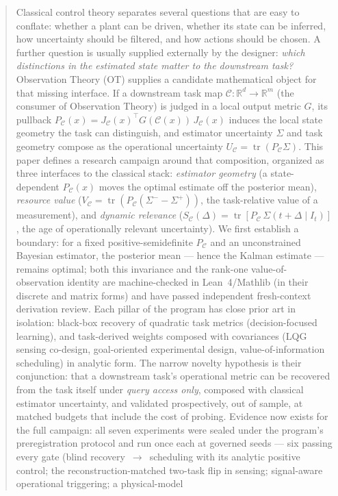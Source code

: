 \documentclass[letterpaper,onecolumn]{IEEEtran}
\theoremstyle{definition}
\theoremstyle{remark}
\newcommand{\R}{\mathbb{R}}
\newcommand{\PC}{P_{\mathcal{C}}}
\newcommand{\tr}{\operatorname{tr}}
\newcommand{\C}{\mathcal{C}}
\newcommand{\Sig}{\Sigma}
\newcommand{\Sm}{\Sigma^{-}}
\newcommand{\Sp}{\Sigma^{+}}
\newcommand{\VC}{V_{\mathcal{C}}}
\newcommand{\UC}{U_{\mathcal{C}}}
\newcommand{\SC}{S_{\mathcal{C}}}
\begin{document}
\begin{abstract}
Classical control theory separates several questions that are easy to
conflate: whether a plant can be driven, whether its state can be inferred,
how uncertainty should be filtered, and how actions should be chosen. A
further question is usually supplied externally by the designer: \emph{which
distinctions in the estimated state matter to the downstream task?}
Observation Theory (OT) supplies a candidate mathematical object for that
missing interface. If a downstream task map $\C:\R^d\to\R^m$ (the consumer
of Observation Theory) is judged in a local output metric $G$, its pullback $\PC(x)=J_\C(x)^{\top}G(\C(x))\,J_\C(x)$ induces the
local state geometry the task can distinguish, and estimator uncertainty
$\Sig$ and task geometry compose as the operational uncertainty
$\UC=\tr(\PC\Sig)$. This paper defines a research campaign around that
composition, organized as three interfaces to the classical stack:
\emph{estimator geometry} (a state-dependent $\PC(x)$ moves the optimal
estimate off the posterior mean), \emph{resource value}
($\VC=\tr(\PC(\Sm-\Sp))$, the task-relative value of a measurement), and
\emph{dynamic relevance} ($\SC(\Delta)=\tr[\PC\,\Sig(t{+}\Delta\mid I_t)]$,
the age of operationally relevant uncertainty). We first establish a
boundary: for a fixed positive-semidefinite $\PC$ and an unconstrained
Bayesian estimator, the posterior mean --- hence the Kalman estimate ---
remains optimal; both this invariance and the rank-one value-of-observation
identity are machine-checked in Lean~4/Mathlib (in their discrete and
matrix forms) and have passed independent fresh-context derivation review.
Each pillar of the program
has close prior art in isolation: black-box recovery of quadratic task
metrics (decision-focused learning), and task-derived weights composed
with covariances (LQG sensing co-design, goal-oriented experimental design,
value-of-information scheduling) in analytic form. The narrow novelty
hypothesis is their conjunction: that a downstream task's operational
metric can be recovered from the task itself under \emph{query access
only}, composed with classical estimator uncertainty, and validated
prospectively, out of sample, at matched budgets that include the cost of
probing. Evidence now exists for the full campaign: all seven experiments
were sealed under the program's preregistration protocol and run once each
at governed seeds --- six passing every gate (blind recovery~$\to$~scheduling
with its analytic positive control; the reconstruction-matched two-task
flip in sensing; signal-aware operational triggering; a physical-model

\end{abstract}
\end{document}
